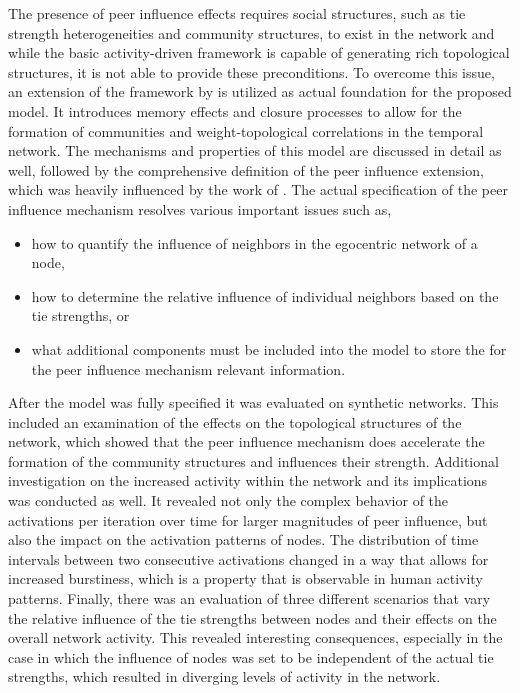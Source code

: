 The presence of peer influence effects requires social structures, such as tie strength heterogeneities and community structures, to exist in the network and while the basic activity-driven framework is capable of generating rich topological structures, it is not able to provide these preconditions.
To overcome this issue, an extension of the framework by \citet{Laurent2015} is utilized as actual foundation for the proposed model.
It introduces memory effects and closure processes to allow for the formation of communities and weight-topological correlations in the temporal network.
The mechanisms and properties of this model are discussed in detail as well, followed by the comprehensive definition of the peer influence extension, which was heavily influenced by the work of \citet{Walk2016}.
The actual specification of the peer influence mechanism resolves various important issues such as,

\begin{itemize}
    \item how to quantify the influence of neighbors in the egocentric network of a node,
    \item how to determine the relative influence of individual neighbors based on the tie strengths, or
    \item what additional components must be included into the model to store the for the peer influence mechanism relevant information.
\end{itemize}

After the model was fully specified it was evaluated on synthetic networks.
This included an examination of the effects on the topological structures of the network, which showed that the peer influence mechanism does accelerate the formation of the community structures and influences their strength.
Additional investigation on the increased activity within the network and its implications was conducted as well.
It revealed not only the complex behavior of the activations per iteration over time for larger magnitudes of peer influence, but also the impact on the activation patterns of nodes.
The distribution of time intervals between two consecutive activations changed in a way that allows for increased burstiness, which is a property that is observable in human activity patterns.
Finally, there was an evaluation of three different scenarios that vary the relative influence of the tie strengths between nodes and their effects on the overall network activity.
This revealed interesting consequences, especially in the case in which the influence of nodes was set to be independent of the actual tie strengths, which resulted in diverging levels of activity in the network.


